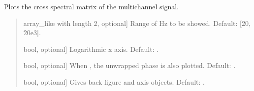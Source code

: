 \documentclass[letterpaper,10pt,english]{sphinxmanual}
\begin{document}
\begin{fulllineitems}
\begin{fulllineitems}
\end{fulllineitems}


\begin{fulllineitems}
\label{\detokenize{classes:dsptools.classes.signal_class.Signal.plot_csm}}
\pysigstartsignatures
{}
\pysigstopsignatures
\sphinxAtStartPar
Plots the cross spectral matrix of the multichannel signal.
\begin{quote}\begin{description}
\begin{description}
\sphinxlineitem{\sphinxstylestrong{range\_hz}}{[}array\_like with length 2, optional{]}
\sphinxAtStartPar
Range of Hz to be showed. Default: {[}20, 20e3{]}.

\sphinxlineitem{\sphinxstylestrong{logx}}{[}bool, optional{]}
\sphinxAtStartPar
Logarithmic x axis. Default: .

\sphinxlineitem{\sphinxstylestrong{with\_phase}}{[}bool, optional{]}
\sphinxAtStartPar
When , the unwrapped phase is also plotted. Default: .

\sphinxlineitem{\sphinxstylestrong{returns}}{[}bool, optional{]}
\sphinxAtStartPar
Gives back figure and axis objects. Default: .

\end{description}

\begin{description}
\end{description}


\end{description}
\end{quote}
\end{fulllineitems}
\end{fulllineitems}
\end{document}
